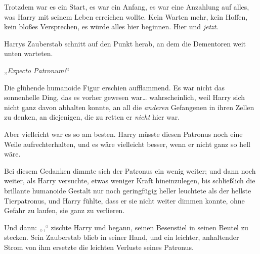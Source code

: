 Trotzdem war es ein Start, es war ein Anfang, es war eine Anzahlung auf alles, was Harry mit seinem Leben erreichen wollte. Kein Warten mehr, kein Hoffen, kein bloßes Versprechen, es würde alles hier beginnen. Hier und \emph{jetzt}.

Harrys Zauberstab schnitt auf den Punkt herab, an dem die Dementoren weit unten warteten.

„\emph{Expecto Patronum!}“

Die glühende humanoide Figur erschien aufflammend. Es war nicht das sonnenhelle Ding, das es vorher gewesen war… wahrscheinlich, weil Harry sich nicht ganz davon abhalten konnte, an all die \emph{anderen} Gefangenen in ihren Zellen zu denken, an diejenigen, die zu retten er \emph{nicht} hier war.

Aber vielleicht war es so am besten. Harry müsste diesen Patronus noch eine Weile aufrechterhalten, und es wäre vielleicht besser, wenn er nicht ganz so hell wäre.

Bei diesem Gedanken dimmte sich der Patronus ein wenig weiter; und dann noch weiter, als Harry versuchte, etwas weniger Kraft hineinzulegen, bis schließlich die brillante humanoide Gestalt nur noch geringfügig heller leuchtete als der hellste Tierpatronus, und Harry fühlte, dass er sie nicht weiter dimmen konnte, ohne Gefahr zu laufen, sie ganz zu verlieren.

Und dann: „,“ zischte Harry und begann, seinen Besenstiel in seinen Beutel zu stecken. Sein Zauberstab blieb in seiner Hand, und ein leichter, anhaltender Strom von ihm ersetzte die leichten Verluste seines Patronus.

